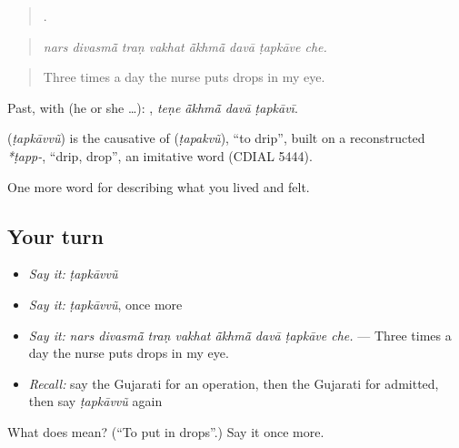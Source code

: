 \begin{quote}
       .
\end{quote}

\begin{quote}
\emph{nars divasmā̃ traṇ vakhat ā̃khmā̃ davā ṭapkāve che.}
\end{quote}

\begin{quote}
Three times a day the nurse puts drops in my eye.
\end{quote}

Past, with  (he or she …):    , \emph{teṇe ā̃khmā̃ davā ṭapkāvī}.

\begin{cousinweb}
\textbf{} (\emph{ṭapkāvvũ}) is the causative of \textbf{} (\emph{ṭapakvũ}), \textquotedblleft{}to drip\textquotedblright{}, built on a reconstructed \emph{*ṭapp-}, \textquotedblleft{}drip, drop\textquotedblright{}, an imitative word (CDIAL 5444).
\end{cousinweb}

\begin{grammarlens}[title={What you've built}]
One more word for describing what you lived and felt.
\end{grammarlens}

\subsection*{Your turn}
\begin{itemize}
\raggedright
  \item \emph{Say it:} \emph{ṭapkāvvũ}
  \item \emph{Say it:} \emph{ṭapkāvvũ}, once more
  \item \emph{Say it:} \emph{nars divasmā̃ traṇ vakhat ā̃khmā̃ davā ṭapkāve che.} — Three times a day the nurse puts drops in my eye.
  \item \emph{Recall:} say the Gujarati for an operation, then the Gujarati for admitted, then say \emph{ṭapkāvvũ} again
\end{itemize}

\begin{tcolorbox}[breakable,colback=teal!4,colframe=teal!35!black,title={Before you move on}]
What does  mean? (\textquotedblleft{}To put in drops\textquotedblright{}.) Say it once more.
\end{tcolorbox}
